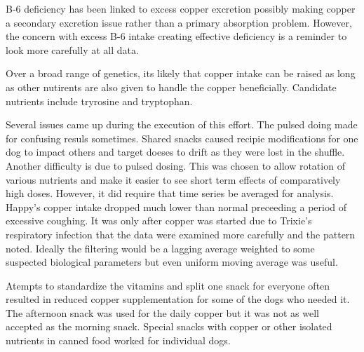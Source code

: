 B-6 deficiency has been linked to excess copper excretion \cite{PMID7814236}
possibly making copper a secondary excretion issue
rather than a primary absorption problem. 
However, the concern with excess B-6 intake creating effective
deficiency is a reminder to look more carefully at all data. 

Over a broad range of genetics, its likely that copper intake
can be raised as long as other nutirents are also given
to handle the copper beneficially.
Candidate nutrients include tryrosine and tryptophan.



Several issues came up during the execution of this effort.
The pulsed doing made for confusing resuls sometimes.
Shared snacks caused recipie modifications for one dog
to impact others and target doeses to drift as they were
lost in the shuffle.
 Another difficulty is  due to pulsed dosing.
This was chosen to allow rotation of various
nutrients and make it easier to see short term effects
of comparatively high doses. However, it did require 
that time series be averaged  for analysis.
Happy's copper intake dropped much lower than normal
preceeding a period of excessive coughing. It was only
after copper was started due to Trixie's  respiratory infection
that the data were examined more carefully and the pattern
noted. Ideally the filtering would be a lagging average
weighted to some suspected biological parameters but
even uniform moving average was useful.   

Atempts to standardize the vitamins and split one snack
for everyone often resulted in reduced copper
supplementation for some of the dogs who needed it.
The afternoon snack was used for the daily copper 
but it was not as well accepted as the morning snack.
Special snacks with copper or other isolated nutrients
in canned food worked for individual dogs. 






